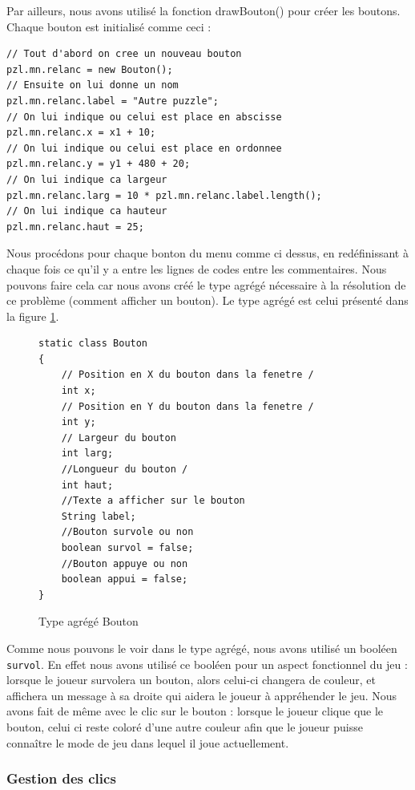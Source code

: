 \documentclass[]{article}
\newcommand{\variable}[1]{\noindent \texttt{#1}}
\begin{document}
Par ailleurs, nous avons utilisé la fonction drawBouton() pour créer les boutons. Chaque bouton est initialisé comme ceci :

\begin{lstlisting}
// Tout d'abord on cree un nouveau bouton
pzl.mn.relanc = new Bouton(); 
// Ensuite on lui donne un nom 
pzl.mn.relanc.label = "Autre puzzle";
// On lui indique ou celui est place en abscisse 
pzl.mn.relanc.x = x1 + 10;
// On lui indique ou celui est place en ordonnee
pzl.mn.relanc.y = y1 + 480 + 20;
// On lui indique ca largeur
pzl.mn.relanc.larg = 10 * pzl.mn.relanc.label.length();
// On lui indique ca hauteur
pzl.mn.relanc.haut = 25;
\end{lstlisting}

Nous procédons pour chaque bonton du menu comme ci dessus, en redéfinissant à chaque fois ce qu'il y a entre les lignes de codes entre les commentaires. Nous pouvons faire cela car nous avons créé le type agrégé nécessaire à la résolution de ce problème (comment afficher un bouton). Le type agrégé est celui présenté dans la figure \no\ref{Type agrégé Bouton}.

\begin{figure}[hpt]
	\center
	\caption{\label{Type agrégé Bouton} Type agrégé Bouton}
\begin{lstlisting}
static class Bouton
{
    // Position en X du bouton dans la fenetre /
    int x;
    // Position en Y du bouton dans la fenetre /
    int y;
    // Largeur du bouton 
    int larg;
    //Longueur du bouton /
    int haut;
    //Texte a afficher sur le bouton 
    String label;
    //Bouton survole ou non 
    boolean survol = false;
    //Bouton appuye ou non 
    boolean appui = false;
} 
\end{lstlisting}
\end{figure}

Comme nous pouvons le voir dans le type agrégé, nous avons utilisé un booléen \variable{survol}. En effet nous avons utilisé ce booléen pour un aspect fonctionnel du jeu : lorsque le joueur survolera un bouton, alors celui-ci changera de couleur, et affichera un message à sa droite qui aidera le joueur à appréhender le jeu. Nous avons fait de même avec le clic sur le bouton : lorsque le joueur clique que le bouton, celui ci reste coloré d'une autre couleur afin que le joueur puisse connaître le mode de jeu dans lequel il joue actuellement.
 
\subsubsection{Gestion des clics}
\end{document}
